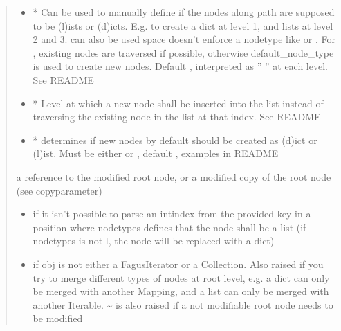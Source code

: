 \documentclass[a4paper,10pt,english]{sphinxmanual}
\begin{document}
\begin{fulllineitems}
\begin{fulllineitems}
\begin{quote}
\begin{description}
\begin{itemize}
\item {}
\sphinxAtStartPar
{} \textendash{} * Can be used to manually define if the nodes along path are supposed to be (l)ists or
(d)icts. E.g.  to create a dict at level 1, and lists at level 2 and 3.  can also be
used \textendash{} space doesn’t enforce a node\sphinxhyphen{}type like  or . For , existing nodes are
traversed if possible, otherwise default\_node\_type is used to create new nodes. Default ,
interpreted as ” ” at each level. See README

\item {}
\sphinxAtStartPar
{} \textendash{} * Level at which a new node shall be inserted into the list instead of traversing the
existing node in the list at that index. See README

\item {}
\sphinxAtStartPar
{} \textendash{} * determines if new nodes by default should be created as (d)ict or (l)ist. Must be
either  or , default , examples in README

\end{itemize}

\sphinxAtStartPar
a reference to the modified root node, or a modified copy of the root node (see copy\sphinxhyphen{}parameter)

\begin{itemize}
\item {}
\sphinxAtStartPar
{} \textendash{} if it isn’t possible to parse an int\sphinxhyphen{}index from the provided key in a position where node\sphinxhyphen{}types
    defines that the node shall be a list (if node\sphinxhyphen{}types is not l, the node will be replaced with a dict)

\item {}
\sphinxAtStartPar
{} \textendash{} if obj is not either a FagusIterator or a Collection. Also raised if you try to merge different
    types of nodes at root level, e.g. a dict can only be merged with another Mapping, and a list can only
    be merged with another Iterable. \textasciitilde{} is also raised if a not modifiable root node needs to be modified


\end{itemize}
\end{description}
\end{quote}
\end{fulllineitems}
\end{fulllineitems}
\end{document}
